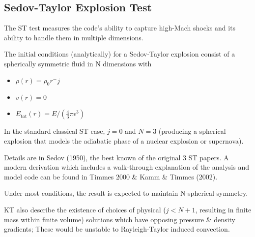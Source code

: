 

\subsection{Sedov-Taylor Explosion Test}

The ST test measures the code's ability to capture high-Mach shocks and its ability to handle
them in multiple dimensions.

The initial conditions (analytically) for a Sedov-Taylor explosion consist of a spherically symmetric
fluid in N dimensions with
\begin{itemize}
\item $\rho(r) = \rho_0 r^-j$
\item $v(r) = 0$
\item $E_{\text{tot}}(r) = E / (\frac{4}{3} \pi \epsilon^3)$
\end{itemize}
In the standard classical ST case, $j=0$ and $N=3$ (producing a spherical explosion that models
the adiabatic phase of a nuclear explosion or supernova).


Details are in Sedov (1950), the best known of the original 3 ST papers. A modern derivation
which includes a walk-through explanation of the analysis and model code can be found in
Timmes 2000 \& Kamm \& Timmes (2002).

Under most conditions, the result is expected to maintain N-spherical symmetry.

KT also describe the existence of choices of physical ($j < N + 1$, resulting in finite mass within 
finite volume) solutions which have opposing pressure \& density gradients; These would be unstable 
to Rayleigh-Taylor induced convection.


